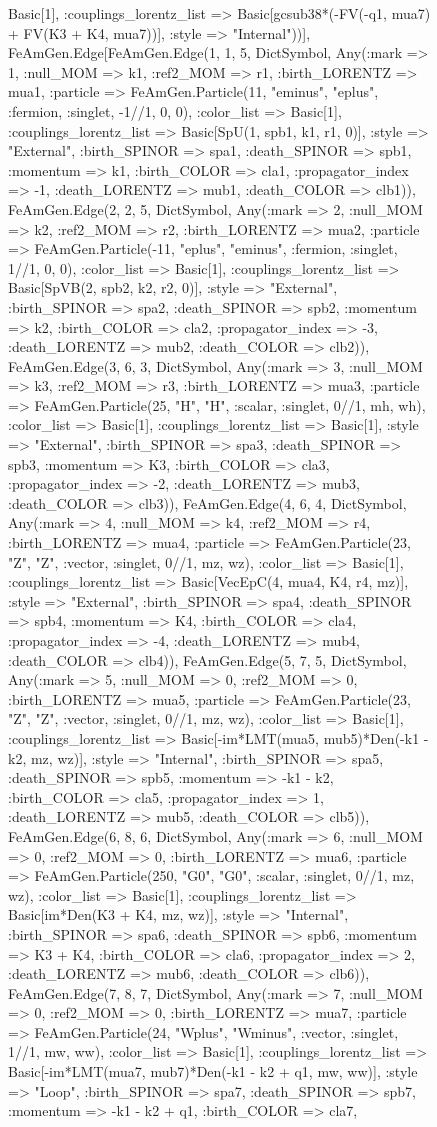 \documentclass{revtex4}
\begin{document}
\begin{figure}[!htb]
\begin{center}
{Basic[1], :couplings_lorentz_list => Basic[gcsub38*(-FV(-q1, mua7) + FV(K3 + K4, mua7))], :style => "Internal"))], FeAmGen.Edge[FeAmGen.Edge(1, 1, 5, Dict{Symbol, Any}(:mark => 1, :null_MOM => k1, :ref2_MOM => r1, :birth_LORENTZ => mua1, :particle => FeAmGen.Particle(11, "eminus", "eplus", :fermion, :singlet, -1//1, 0, 0), :color_list => Basic[1], :couplings_lorentz_list => Basic[SpU(1, spb1, k1, r1, 0)], :style => "External", :birth_SPINOR => spa1, :death_SPINOR => spb1, :momentum => k1, :birth_COLOR => cla1, :propagator_index => -1, :death_LORENTZ => mub1, :death_COLOR => clb1)), FeAmGen.Edge(2, 2, 5, Dict{Symbol, Any}(:mark => 2, :null_MOM => k2, :ref2_MOM => r2, :birth_LORENTZ => mua2, :particle => FeAmGen.Particle(-11, "eplus", "eminus", :fermion, :singlet, 1//1, 0, 0), :color_list => Basic[1], :couplings_lorentz_list => Basic[SpVB(2, spb2, k2, r2, 0)], :style => "External", :birth_SPINOR => spa2, :death_SPINOR => spb2, :momentum => k2, :birth_COLOR => cla2, :propagator_index => -3, :death_LORENTZ => mub2, :death_COLOR => clb2)), FeAmGen.Edge(3, 6, 3, Dict{Symbol, Any}(:mark => 3, :null_MOM => k3, :ref2_MOM => r3, :birth_LORENTZ => mua3, :particle => FeAmGen.Particle(25, "H", "H", :scalar, :singlet, 0//1, mh, wh), :color_list => Basic[1], :couplings_lorentz_list => Basic[1], :style => "External", :birth_SPINOR => spa3, :death_SPINOR => spb3, :momentum => K3, :birth_COLOR => cla3, :propagator_index => -2, :death_LORENTZ => mub3, :death_COLOR => clb3)), FeAmGen.Edge(4, 6, 4, Dict{Symbol, Any}(:mark => 4, :null_MOM => k4, :ref2_MOM => r4, :birth_LORENTZ => mua4, :particle => FeAmGen.Particle(23, "Z", "Z", :vector, :singlet, 0//1, mz, wz), :color_list => Basic[1], :couplings_lorentz_list => Basic[VecEpC(4, mua4, K4, r4, mz)], :style => "External", :birth_SPINOR => spa4, :death_SPINOR => spb4, :momentum => K4, :birth_COLOR => cla4, :propagator_index => -4, :death_LORENTZ => mub4, :death_COLOR => clb4)), FeAmGen.Edge(5, 7, 5, Dict{Symbol, Any}(:mark => 5, :null_MOM => 0, :ref2_MOM => 0, :birth_LORENTZ => mua5, :particle => FeAmGen.Particle(23, "Z", "Z", :vector, :singlet, 0//1, mz, wz), :color_list => Basic[1], :couplings_lorentz_list => Basic[-im*LMT(mua5, mub5)*Den(-k1 - k2, mz, wz)], :style => "Internal", :birth_SPINOR => spa5, :death_SPINOR => spb5, :momentum => -k1 - k2, :birth_COLOR => cla5, :propagator_index => 1, :death_LORENTZ => mub5, :death_COLOR => clb5)), FeAmGen.Edge(6, 8, 6, Dict{Symbol, Any}(:mark => 6, :null_MOM => 0, :ref2_MOM => 0, :birth_LORENTZ => mua6, :particle => FeAmGen.Particle(250, "G0", "G0", :scalar, :singlet, 0//1, mz, wz), :color_list => Basic[1], :couplings_lorentz_list => Basic[im*Den(K3 + K4, mz, wz)], :style => "Internal", :birth_SPINOR => spa6, :death_SPINOR => spb6, :momentum => K3 + K4, :birth_COLOR => cla6, :propagator_index => 2, :death_LORENTZ => mub6, :death_COLOR => clb6)), FeAmGen.Edge(7, 8, 7, Dict{Symbol, Any}(:mark => 7, :null_MOM => 0, :ref2_MOM => 0, :birth_LORENTZ => mua7, :particle => FeAmGen.Particle(24, "Wplus", "Wminus", :vector, :singlet, 1//1, mw, ww), :color_list => Basic[1], :couplings_lorentz_list => Basic[-im*LMT(mua7, mub7)*Den(-k1 - k2 + q1, mw, ww)], :style => "Loop", :birth_SPINOR => spa7, :death_SPINOR => spb7, :momentum => -k1 - k2 + q1, :birth_COLOR => cla7, }
\end{center}
\end{figure}
\end{document}
